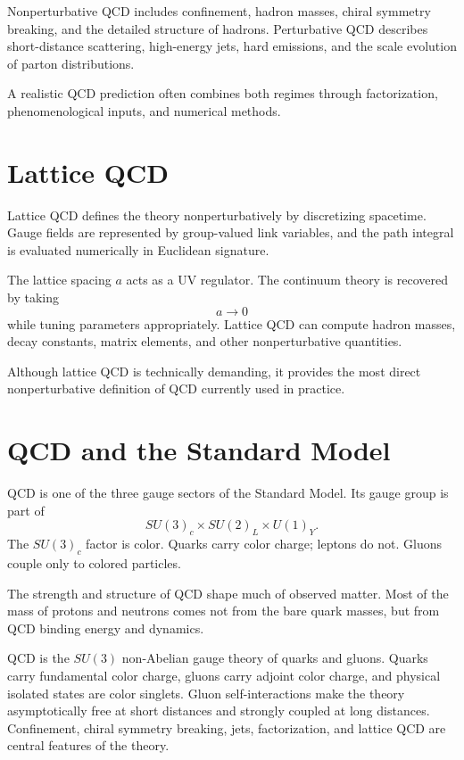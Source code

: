 Nonperturbative QCD includes confinement, hadron masses, chiral symmetry
breaking, and the detailed structure of hadrons. Perturbative QCD describes
short-distance scattering, high-energy jets, hard emissions, and the scale
evolution of parton distributions.

A realistic QCD prediction often combines both regimes through factorization,
phenomenological inputs, and numerical methods.

\section{Lattice QCD}

Lattice QCD defines the theory nonperturbatively by discretizing spacetime. Gauge
fields are represented by group-valued link variables, and the path integral is
evaluated numerically in Euclidean signature.

The lattice spacing \(a\) acts as a UV regulator. The continuum theory is
recovered by taking
\[
    a\to0
\]
while tuning parameters appropriately. Lattice QCD can compute hadron masses,
decay constants, matrix elements, and other nonperturbative quantities.

Although lattice QCD is technically demanding, it provides the most direct
nonperturbative definition of QCD currently used in practice.

\section{QCD and the Standard Model}

QCD is one of the three gauge sectors of the Standard Model. Its gauge group is
part of
\[
    SU(3)_c\times SU(2)_L\times U(1)_Y.
\]
The \(SU(3)_c\) factor is color. Quarks carry color charge; leptons do not.
Gluons couple only to colored particles.

The strength and structure of QCD shape much of observed matter. Most of the
mass of protons and neutrons comes not from the bare quark masses, but from QCD
binding energy and dynamics.

\begin{summarybox}
QCD is the \(SU(3)\) non-Abelian gauge theory of quarks and gluons. Quarks carry
fundamental color charge, gluons carry adjoint color charge, and physical
isolated states are color singlets. Gluon self-interactions make the theory
asymptotically free at short distances and strongly coupled at long distances.
Confinement, chiral symmetry breaking, jets, factorization, and lattice QCD are
central features of the theory.
\end{summarybox}

